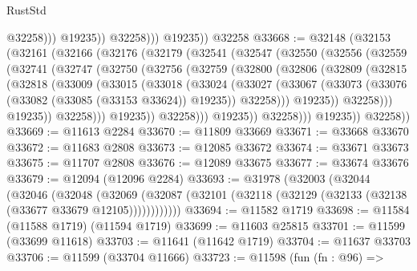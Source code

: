 \begin{lexlean}{RustStd}
\begin{coremodule}
                        @32258)))
                  @19235))
              @32258)))
        @19235))
    @32258
@33668 := @32148
    (@32153
      (@32161
        (@32166
          (@32176
            (@32179
              (@32541
                (@32547
                  (@32550
                    (@32556
                      (@32559
                        (@32741
                          (@32747
                            (@32750
                              (@32756
                                (@32759
                                  (@32800
                                    (@32806
                                      (@32809
                                        (@32815
                                          (@32818
                                            (@33009
                                              (@33015
                                                (@33018
                                                  (@33024
                                                    (@33027
                                                      (@33067
                                                        (@33073
                                                          (@33076
                                                            (@33082
                                                              (@33085 (@33153 @33624))
                                                              @19235))
                                                          @32258)))
                                                    @19235))
                                                @32258)))
                                          @19235))
                                      @32258)))
                                @19235))
                            @32258)))
                      @19235))
                  @32258)))
            @19235))
        @32258))
@33669 := @11613 @2284
@33670 := @11809 @33669
@33671 := @33668 @33670
@33672 := @11683 @2808
@33673 := @12085 @33672
@33674 := @33671 @33673
@33675 := @11707 @2808
@33676 := @12089 @33675
@33677 := @33674 @33676
@33679 := @12094 (@12096 @2284)
@33693 := @31978
    (@32003
      (@32044
        (@32046
          (@32048
            (@32069
              (@32087 (@32101 (@32118 (@32129 (@32133 (@32138 (@33677 @33679 @12105))))))))))))
@33694 := @11582 @1719
@33698 := @11584 (@11588 @1719) (@11594 @1719)
@33699 := @11603 @25815
@33701 := @11599 (@33699 @11618)
@33703 := @11641 (@11642 @1719)
@33704 := @11637 @33703
@33706 := @11599 (@33704 @11666)
@33723 := @11598
    (fun (fn : @96) =>

\end{coremodule}
\end{lexlean}
